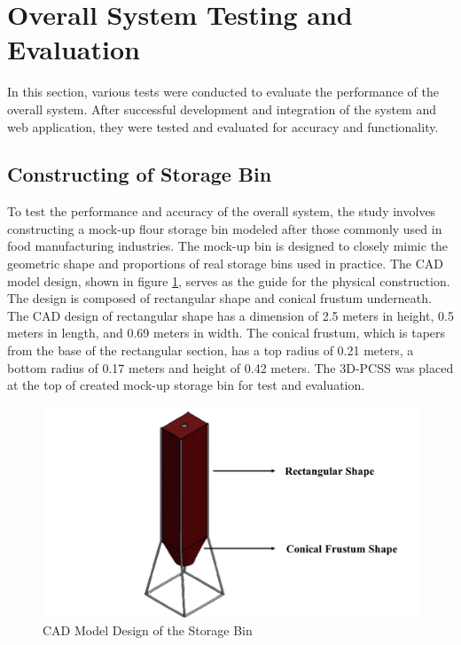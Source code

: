 \section{Overall System Testing and Evaluation}
\label{ch3:sec:TestingAndEvaluation}

In this section, various tests were conducted to evaluate the performance of the overall system. After successful development and integration of the system and web application, they were tested and evaluated for accuracy and functionality.

\subsection{Constructing of Storage Bin}
\label{ch3:subsec:constructing-of-storage-bin}
To test the performance and accuracy of the overall system, the study involves constructing a mock-up flour storage bin modeled after those commonly used in food manufacturing industries. The mock-up bin is designed to closely mimic the geometric shape and proportions of real storage bins used in practice. The CAD model design, shown in figure \ref{ch3:fig:cad_storage_bin}, serves as the guide for the physical construction. The design is composed of rectangular shape and conical frustum underneath. The CAD design of rectangular shape has a dimension of 2.5 meters in height, 0.5 meters in length, and 0.69 meters in width. The conical frustum, which is tapers from the base of the rectangular section, has a top radius of 0.21 meters, a bottom radius of 0.17 meters and height of 0.42 meters. The 3D-PCSS was placed at the top of created mock-up storage bin for test and evaluation.

\begin{figure}[H]
	\centering
	\includegraphics[width=1\textwidth]{Figures/cad_storage_bin}
	\caption{CAD Model Design of the Storage Bin}
	\label{ch3:fig:cad_storage_bin}
\end{figure}

